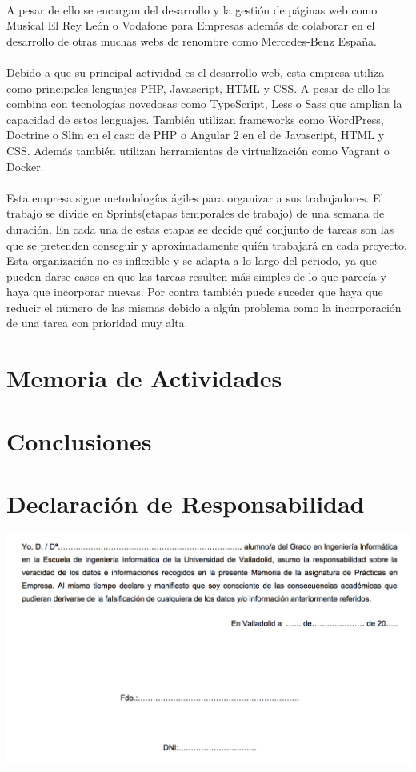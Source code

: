 \documentclass[10pt, a4paper,spanish]{article}
\begin{document}
        \paragraph{}
        A pesar de ello se encargan del desarrollo y la gestión de páginas web como Musical El Rey León o Vodafone para Empresas además de colaborar en el desarrollo de otras muchas webs de renombre como Mercedes-Benz España.

        \paragraph{}
        Debido a que su principal actividad es el desarrollo web, esta empresa utiliza como principales lenguajes PHP, Javascript, HTML y CSS. A pesar de ello los combina con tecnologías novedosas como TypeScript, Less o Sass que amplian la capacidad de estos lenguajes. También utilizan frameworks como WordPress, Doctrine o Slim en el caso de PHP o Angular 2 en el de Javascript, HTML y CSS. Además también utilizan herramientas de virtualización como Vagrant o Docker.

        \paragraph{}
        Esta empresa sigue metodologías ágiles para organizar a sus trabajadores. El trabajo se divide en Sprints(etapas temporales de trabajo) de una semana de duración. En cada una de estas etapas se decide qué conjunto de tareas son las que se pretenden conseguir y aproximadamente quién trabajará en cada proyecto. Esta organización no es inflexible y se adapta a lo largo del periodo, ya que pueden darse casos en que las tareas resulten más simples de lo que parecía y haya que incorporar nuevas. Por contra también puede suceder que haya que reducir el número de las mismas debido a algún problema como la incorporación de una tarea con prioridad muy alta. 

    \section{Memoria de Actividades}



    \section{Conclusiones}



    \newpage
    \section{Declaración de Responsabilidad}

        \includegraphics[width=\textwidth]{res/responsibility-declaration}
\end{document}
